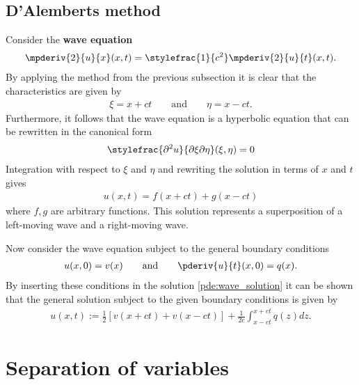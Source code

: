 \subsection{D'Alemberts method}

    Consider the \textbf{wave equation}
    \begin{gather}
        \label{pde:wave_equation}
        \mpderiv{2}{u}{x}(x, t) = \stylefrac{1}{c^2}\mpderiv{2}{u}{t}(x, t).
    \end{gather}
    By applying the method from the previous subsection it is clear that the characteristics are given by
    \begin{gather}
        \xi = x + ct\qquad\text{and}\qquad \eta = x - ct.
    \end{gather}
    Furthermore, it follows that the wave equation is a hyperbolic equation that can be rewritten in the canonical form
    \begin{gather}
        \label{pde:canonical_wave_equation}
        \stylefrac{\partial^2u}{\partial\xi\partial\eta}(\xi,\eta) = 0
    \end{gather}
    Integration with respect to $\xi$ and $\eta$ and rewriting the solution in terms of $x$ and $t$ gives
    \begin{gather}
        \label{pde:wave_solution}
        u(x, t) = f(x+ct) + g(x-ct)
    \end{gather}
    where $f, g$ are arbitrary functions. This solution represents a superposition of a left-moving wave and a right-moving wave.

    Now consider the wave equation subject to the general boundary conditions
    \begin{gather}
        u(x, 0) = v(x)\qquad\text{and}\qquad \pderiv{u}{t}(x, 0) = q(x).
    \end{gather}
    By inserting these conditions in the solution \ref{pde:wave_solution} it can be shown that the general solution subject to the given boundary conditions is given by
    \begin{gather}
        \label{pde:dalembert_solution}
        u(x, t) := \frac{1}{2}\left[v(x+ct) + v(x-ct)\right] + \frac{1}{2c}\int_{x-ct}^{x+ct}q(z)dz.
    \end{gather}

\section{Separation of variables}

